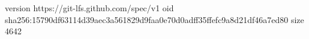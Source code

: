 version https://git-lfs.github.com/spec/v1
oid sha256:15790df63114d39aec3a561829d9faa0e70d0adff35ffefc9a8d21df46a7ed80
size 4642
